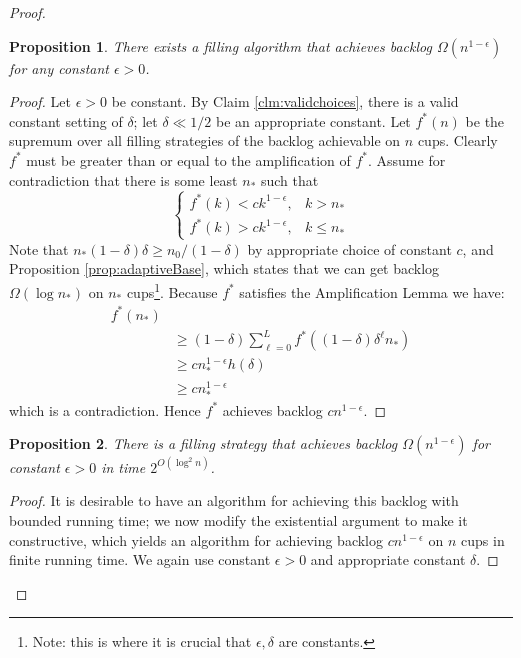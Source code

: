 \documentclass[twocolumn]{article}[10pt]
\newtheorem{proposition}{Proposition}
\begin{document}
\begin{proof}
  \begin{proposition}
    There exists a filling algorithm that achieves backlog
    $\Omega(n^{1-\epsilon})$ for any constant $\epsilon > 0$.
  \end{proposition}
  \begin{proof}
  Let $\epsilon > 0$ be constant. By Claim \ref{clm:validchoices}, there is a
  valid constant setting of $\delta$; let $\delta \ll 1/2$ be an appropriate
  constant. Let $f^*(n)$ be the supremum over all filling strategies of the
  backlog achievable on $n$ cups. Clearly $f^*$ must be greater than or equal to
  the amplification of $f^*$. Assume for contradiction that there is some least
  $n_*$ such that 
  $$\begin{cases}
    f^*(k)< ck^{1-\epsilon}, & k > n_*\\
    f^*(k)> ck^{1-\epsilon}, & k \le n_*
  \end{cases} $$
  Note that $n_*(1-\delta)\delta \ge n_0/(1-\delta)$ by appropriate choice of constant
  $c$, and Proposition \ref{prop:adaptiveBase}, which states that we can get
  backlog $\Omega(\log n_*)$ on $n_*$ cups\footnote{Note: this is where it is
  crucial that $\epsilon, \delta$ are constants.}.
  Because $f^*$ satisfies the Amplification Lemma we have:
\begin{align*}
  f^*(n_*) & \\
           &\ge (1-\delta)\sum_{\ell=0}^L f^*((1-\delta)\delta^\ell n_*) \\
           &\ge cn_*^{1-\epsilon} h(\delta)\\
           &\ge cn_*^{1-\epsilon}
\end{align*}
which is a contradiction. Hence $f^*$ achieves backlog $cn^{1-\epsilon}$.
    
  \end{proof}

  \begin{proposition}
    \label{prop:constructive_nepsil}
    There is a filling strategy that achieves backlog
    $\Omega(n^{1-\epsilon})$ for constant $\epsilon > 0$ in time $2^{O(\log^2 n)}$.
  \end{proposition}
  \begin{proof}
It is desirable to have an algorithm for achieving this backlog with bounded
running time; we now modify the existential argument to make it constructive, 
which yields an algorithm for achieving backlog $cn^{1-\epsilon}$ on $n$ cups 
in finite running time. We again use constant $\epsilon > 0$ and appropriate constant $\delta$.


\end{proof}
\end{proof}
\end{document}
